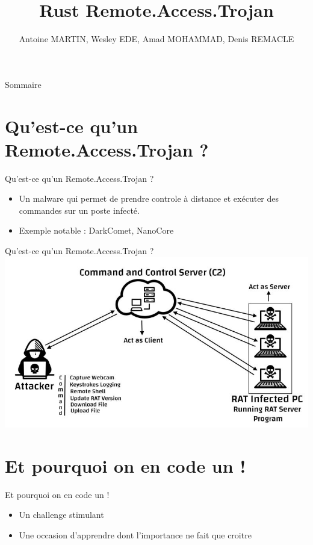 \documentclass{beamer}
\title{Rust Remote.Access.Trojan}
\author{Antoine MARTIN, Wesley EDE, Amad MOHAMMAD, Denis REMACLE}
\begin{document}
  \begin{frame}
 \maketitle
  \end{frame}

\begin{frame}{Sommaire}
    \tableofcontents
\end{frame}

\section{Qu'est-ce qu'un Remote.Access.Trojan ?}
  \begin{frame}{Qu'est-ce qu'un Remote.Access.Trojan ?}
  \begin{itemize}
	\item Un malware qui permet de prendre controle à distance et exécuter des commandes sur un poste infecté.
	\item Exemple notable : DarkComet, NanoCore
  \end{itemize}
  \end{frame}

  \begin{frame}{Qu'est-ce qu'un Remote.Access.Trojan ?}
\includegraphics[scale=.4]{Schema.jpg}
  \end{frame}

\section{Et pourquoi on en code un !}
  \begin{frame}{Et pourquoi on en code un !}
  \begin{itemize}
	\item Un challenge stimulant
	\item Une occasion d'apprendre dont l'importance ne fait que croitre
  \end{itemize}
  \end{frame}
\end{document}
